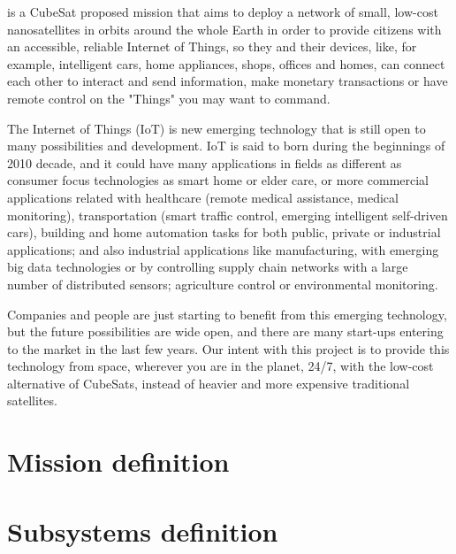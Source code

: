 \MissionName is a CubeSat proposed mission that aims to deploy a network of small,
low-cost nanosatellites in orbits around the whole Earth in order to provide
citizens with an accessible, reliable Internet of Things, so they and their devices,
like, for example, intelligent cars, home appliances, shops, offices and homes, can
connect each other to interact and send information, make monetary transactions or
have remote control on the "Things" you may want to command.

The Internet of Things (IoT) is new emerging technology that is still open to many
possibilities and development. IoT is said to born during the beginnings of 2010 decade,
and it could have many applications in fields as different as consumer focus technologies
as smart home or elder care, or more commercial applications related with healthcare 
(remote medical assistance, medical monitoring), transportation (smart traffic control,
emerging intelligent self-driven cars), building and home automation tasks for both
public, private or industrial applications; and also industrial applications like
manufacturing, with emerging big data technologies or by controlling supply chain
networks with a large number of distributed sensors; agriculture control or environmental
monitoring.

Companies and people are just starting to benefit from this emerging technology,
but the future possibilities are wide open, and there are many start-ups
entering to the market in the last few years. Our intent with this project is
to provide this technology from space, wherever you are in the planet, 24/7, with
the low-cost alternative of CubeSats, instead of heavier and more expensive
traditional satellites.

\section{Mission definition}

\section{Subsystems definition}
